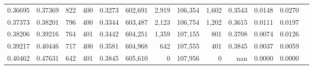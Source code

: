 \begin{tabular}{rrrrrrrrrrrrr}
0.36695 & 0.37369 &   822 & 400 &                                     0.3273 & 602,691 &   2,919 & 106,354 &   1,602 & 0.3543 & 0.0148 & 0.0270 \\
0.37373 & 0.38201 &   796 & 400 &                                     0.3344 & 603,487 &   2,123 & 106,754 &   1,202 & 0.3615 & 0.0111 & 0.0197 \\
0.38206 & 0.39216 &   764 & 401 &                                     0.3442 & 604,251 &   1,359 & 107,155 &     801 & 0.3708 & 0.0074 & 0.0126 \\
0.39217 & 0.40446 &   717 & 400 &                                     0.3581 & 604,968 &     642 & 107,555 &     401 & 0.3845 & 0.0037 & 0.0059 \\
0.40462 & 0.47631 &   642 & 401 &                                     0.3845 & 605,610 &       0 & 107,956 &       0 &    nan & 0.0000 & 0.0000 \\
\bottomrule
\end{tabular}
